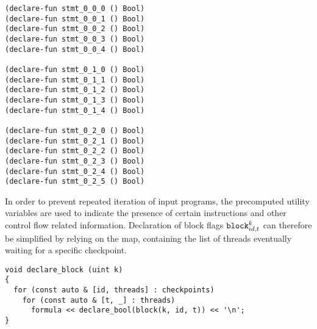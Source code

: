 \begin{lstlisting}[style=smtlib]
(declare-fun stmt_0_0_0 () Bool)
(declare-fun stmt_0_0_1 () Bool)
(declare-fun stmt_0_0_2 () Bool)
(declare-fun stmt_0_0_3 () Bool)
(declare-fun stmt_0_0_4 () Bool)

(declare-fun stmt_0_1_0 () Bool)
(declare-fun stmt_0_1_1 () Bool)
(declare-fun stmt_0_1_2 () Bool)
(declare-fun stmt_0_1_3 () Bool)
(declare-fun stmt_0_1_4 () Bool)

(declare-fun stmt_0_2_0 () Bool)
(declare-fun stmt_0_2_1 () Bool)
(declare-fun stmt_0_2_2 () Bool)
(declare-fun stmt_0_2_3 () Bool)
(declare-fun stmt_0_2_4 () Bool)
(declare-fun stmt_0_2_5 () Bool)
\end{lstlisting}



\noindent
In order to prevent repeated iteration of input programs,
the precomputed utility variables are used to indicate the presence of certain instructions and other control flow related information.
Declaration of block flags $\texttt{block}^k_{id, t}$ can therefore be simplified by relying on the  map,
containing the list of threads eventually waiting for a specific checkpoint.

\begin{lstlisting}[style=c++]
void declare_block (uint k)
{
  for (const auto & [id, threads] : checkpoints)
    for (const auto & [t, _] : threads)
      formula << declare_bool(block(k, id, t)) << '\n';
}
\end{lstlisting}

